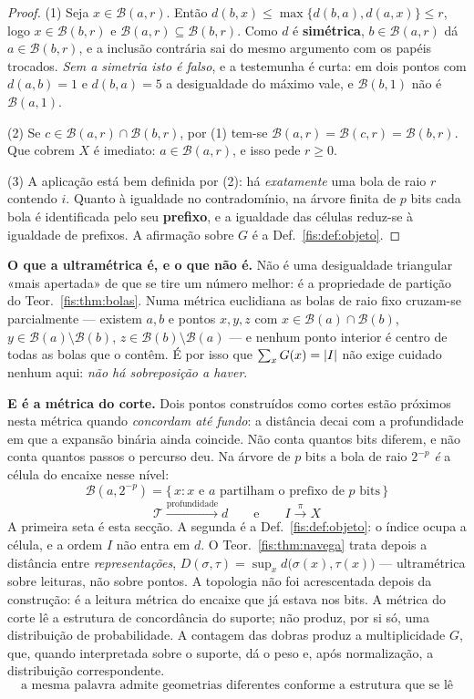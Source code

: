 \documentclass[livro.tex]{subfiles}
\begin{document}
\begin{proof}
(1) Seja $x\in \mathcal{B}(a,r)$. Então $d(b,x)\le\max\{d(b,a),d(a,x)\}\le r$,
logo $x\in \mathcal{B}(b,r)$ e $\mathcal{B}(a,r)\subseteq \mathcal{B}(b,r)$. Como
$d$ é \textbf{simétrica}, $b\in \mathcal{B}(a,r)$ dá $a\in \mathcal{B}(b,r)$, e a
inclusão contrária sai do mesmo argumento com os papéis trocados. \emph{Sem a
simetria isto é falso}, e a testemunha é curta: em dois pontos com $d(a,b)=1$ e
$d(b,a)=5$ a desigualdade do máximo vale, e $\mathcal{B}(b,1)$ não é
$\mathcal{B}(a,1)$.

(2) Se $c\in \mathcal{B}(a,r)\cap \mathcal{B}(b,r)$, por (1) tem-se
$\mathcal{B}(a,r)=\mathcal{B}(c,r)=\mathcal{B}(b,r)$. Que cobrem $X$ é imediato:
$a\in \mathcal{B}(a,r)$, e isso pede $r\ge0$.

(3) A aplicação está bem definida por (2): há \emph{exatamente} uma bola de raio
$r$ contendo $i$. Quanto à igualdade no contradomínio, na árvore finita de $p$
bits cada bola é identificada pelo seu \textbf{prefixo}, e a igualdade das
células reduz-se à igualdade de prefixos. A afirmação sobre $G$ é a
Def.~\ref{fis:def:objeto}.
\end{proof}

\medskip\noindent\textbf{O que a ultramétrica é, e o que não é.} Não é uma
desigualdade triangular «mais apertada» de que se tire um número melhor: é a
propriedade de partição do Teor.~\ref{fis:thm:bolas}. Numa métrica euclidiana as
bolas de raio fixo cruzam-se parcialmente --- existem $a,b$ e pontos $x,y,z$ com
$x\in\mathcal{B}(a)\cap\mathcal{B}(b)$, $y\in\mathcal{B}(a)\setminus\mathcal{B}(b)$,
$z\in\mathcal{B}(b)\setminus\mathcal{B}(a)$ --- e nenhum ponto interior é centro
de todas as bolas que o contêm. É por isso que $\sum_x G(x)=\lvert I\rvert$ não exige
cuidado nenhum aqui: \emph{não há sobreposição a haver}.

\medskip\noindent\textbf{E é a métrica do corte.} Dois pontos construídos como
cortes estão próximos nesta métrica quando \emph{concordam até fundo}: a
distância decai com a profundidade em que a expansão binária ainda coincide. Não
conta quantos bits diferem, e não conta quantos passos o percurso deu. Na árvore
de $p$ bits a bola de raio $2^{-p}$ \emph{é} a célula do encaixe nesse nível:
\[
\boxed{\;
\mathcal{B}(a,2^{-p})
=
\{\,x:\text{$x$ e $a$ partilham o prefixo de $p$ bits}\,\}
\;}
\]
\[
\boxed{\;
\mathcal{T}
\overset{\mathrm{profundidade}}{\longrightarrow}
d
\qquad\text{e}\qquad
I
\overset{\pi}{\longrightarrow}
X
\;}
\]
A primeira seta é esta secção. A segunda é a Def.~\ref{fis:def:objeto}: o índice
ocupa a célula, e a ordem $I$ não entra em $d$. O Teor.~\ref{fis:thm:navega}
trata depois a distância entre \emph{representações},
$D(\sigma,\tau)=\sup_x d\bigl(\sigma(x),\tau(x)\bigr)$ --- ultramétrica sobre
leituras, não sobre pontos. A topologia não foi acrescentada depois da
construção: é a leitura métrica do encaixe que já estava nos bits. A métrica do
corte lê a estrutura de concordância do suporte; não produz, por si só, uma
distribuição de probabilidade. A contagem das dobras produz a multiplicidade
$G$, que, quando interpretada sobre o suporte, dá o peso e, após
normalização, a distribuição correspondente.
\[
\boxed{\;\text{a mesma palavra admite geometrias diferentes conforme a estrutura que se lê}\;}
\]
\end{document}
